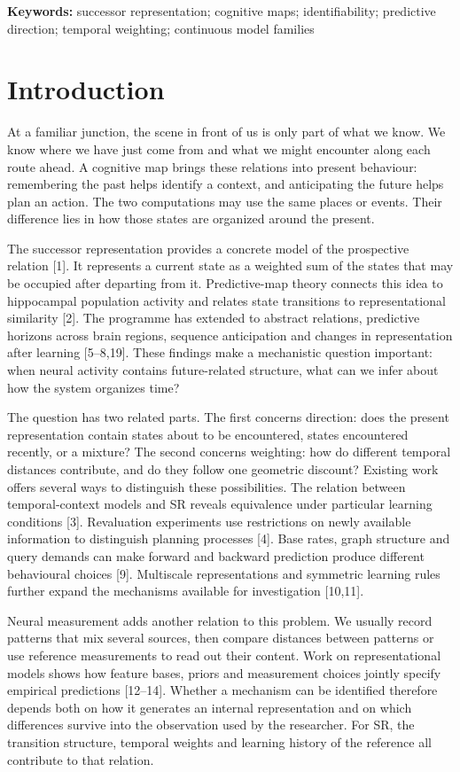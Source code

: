 \documentclass[11pt,a4paper]{article}
\begin{document}
\textbf{Keywords:} successor representation; cognitive maps;
identifiability; predictive direction; temporal weighting; continuous
model families

\section{Introduction}\label{introduction}

At a familiar junction, the scene in front of us is only part of what we
know. We know where we have just come from and what we might encounter
along each route ahead. A cognitive map brings these relations into
present behaviour: remembering the past helps identify a context, and
anticipating the future helps plan an action. The two computations may
use the same places or events. Their difference lies in how those states
are organized around the present.

The successor representation provides a concrete model of the
prospective relation {[}1{]}. It represents a current state as a
weighted sum of the states that may be occupied after departing from it.
Predictive-map theory connects this idea to hippocampal population
activity and relates state transitions to representational similarity
{[}2{]}. The programme has extended to abstract relations, predictive
horizons across brain regions, sequence anticipation and changes in
representation after learning {[}5–8,19{]}. These findings make a
mechanistic question important: when neural activity contains
future-related structure, what can we infer about how the system
organizes time?

The question has two related parts. The first concerns direction: does
the present representation contain states about to be encountered,
states encountered recently, or a mixture? The second concerns
weighting: how do different temporal distances contribute, and do they
follow one geometric discount? Existing work offers several ways to
distinguish these possibilities. The relation between temporal-context
models and SR reveals equivalence under particular learning conditions
{[}3{]}. Revaluation experiments use restrictions on newly available
information to distinguish planning processes {[}4{]}. Base rates, graph
structure and query demands can make forward and backward prediction
produce different behavioural choices {[}9{]}. Multiscale
representations and symmetric learning rules further expand the
mechanisms available for investigation {[}10,11{]}.

Neural measurement adds another relation to this problem. We usually
record patterns that mix several sources, then compare distances between
patterns or use reference measurements to read out their content. Work
on representational models shows how feature bases, priors and
measurement choices jointly specify empirical predictions {[}12–14{]}.
Whether a mechanism can be identified therefore depends both on how it
generates an internal representation and on which differences survive
into the observation used by the researcher. For SR, the transition
structure, temporal weights and learning history of the reference all
contribute to that relation.
\end{document}
